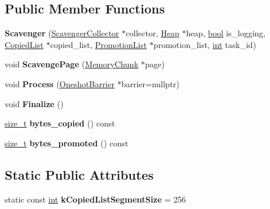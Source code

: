 \subsection*{Public Member Functions}
\begin{DoxyCompactItemize}
\item 
\mbox{\label{classv8_1_1internal_1_1Scavenger_a6299ec93290b7d39714d6ae176cd4933}} 
{\bfseries Scavenger} (\mbox{\hyperlink{classv8_1_1internal_1_1ScavengerCollector}{Scavenger\+Collector}} $\ast$collector, \mbox{\hyperlink{classv8_1_1internal_1_1Heap}{Heap}} $\ast$heap, \mbox{\hyperlink{classbool}{bool}} is\+\_\+logging, \mbox{\hyperlink{classv8_1_1internal_1_1Worklist}{Copied\+List}} $\ast$copied\+\_\+list, \mbox{\hyperlink{classv8_1_1internal_1_1Scavenger_1_1PromotionList}{Promotion\+List}} $\ast$promotion\+\_\+list, \mbox{\hyperlink{classint}{int}} task\+\_\+id)
\item 
\mbox{\label{classv8_1_1internal_1_1Scavenger_ad7fe349f227846d596ddaaed6ae276e5}} 
void {\bfseries Scavenge\+Page} (\mbox{\hyperlink{classv8_1_1internal_1_1MemoryChunk}{Memory\+Chunk}} $\ast$page)
\item 
\mbox{\label{classv8_1_1internal_1_1Scavenger_a309c4023d0bc51d0daba413f726b9ade}} 
void {\bfseries Process} (\mbox{\hyperlink{classv8_1_1internal_1_1OneshotBarrier}{Oneshot\+Barrier}} $\ast$barrier=nullptr)
\item 
\mbox{\label{classv8_1_1internal_1_1Scavenger_adf02128e5bcdcd1cd1423e0c613d31eb}} 
void {\bfseries Finalize} ()
\item 
\mbox{\label{classv8_1_1internal_1_1Scavenger_a3badbc31071db1d1fe8f39fc68b4226c}} 
\mbox{\hyperlink{classsize__t}{size\+\_\+t}} {\bfseries bytes\+\_\+copied} () const
\item 
\mbox{\label{classv8_1_1internal_1_1Scavenger_ae9a9d7f253c3a4556506c4aeacb7242a}} 
\mbox{\hyperlink{classsize__t}{size\+\_\+t}} {\bfseries bytes\+\_\+promoted} () const
\end{DoxyCompactItemize}
\subsection*{Static Public Attributes}
\begin{DoxyCompactItemize}
\item 
\mbox{\label{classv8_1_1internal_1_1Scavenger_ad72b81efc6dcf76f0f4792ee32017915}} 
static const \mbox{\hyperlink{classint}{int}} {\bfseries k\+Copied\+List\+Segment\+Size} = 256
\end{DoxyCompactItemize}
